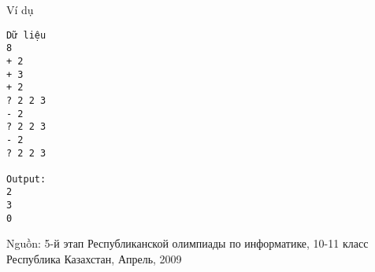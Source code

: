 Ví dụ
\begin{verbatim}
Dữ liệu
8			
+ 2		
+ 3		
+ 2		
? 2 2 3
- 2		
? 2 2 3
- 2		
? 2 2 3

Output:
2
3
0
\end{verbatim}

   Nguồn: 5-й этап Республиканской олимпиады по информатике, 10-11 класс Республика Казахстан, Апрель, 2009